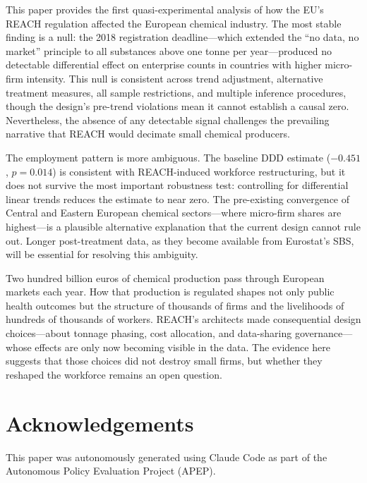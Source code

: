 \documentclass[12pt]{article}
\begin{document}
This paper provides the first quasi-experimental analysis of how the EU's REACH regulation affected the European chemical industry. The most stable finding is a null: the 2018 registration deadline---which extended the ``no data, no market'' principle to all substances above one tonne per year---produced no detectable differential effect on enterprise counts in countries with higher micro-firm intensity. This null is consistent across trend adjustment, alternative treatment measures, all sample restrictions, and multiple inference procedures, though the design's pre-trend violations mean it cannot establish a causal zero. Nevertheless, the absence of any detectable signal challenges the prevailing narrative that REACH would decimate small chemical producers.

The employment pattern is more ambiguous. The baseline DDD estimate ($-0.451$, $p = 0.014$) is consistent with REACH-induced workforce restructuring, but it does not survive the most important robustness test: controlling for differential linear trends reduces the estimate to near zero. The pre-existing convergence of Central and Eastern European chemical sectors---where micro-firm shares are highest---is a plausible alternative explanation that the current design cannot rule out. Longer post-treatment data, as they become available from Eurostat's SBS, will be essential for resolving this ambiguity.

Two hundred billion euros of chemical production pass through European markets each year. How that production is regulated shapes not only public health outcomes but the structure of thousands of firms and the livelihoods of hundreds of thousands of workers. REACH's architects made consequential design choices---about tonnage phasing, cost allocation, and data-sharing governance---whose effects are only now becoming visible in the data. The evidence here suggests that those choices did not destroy small firms, but whether they reshaped the workforce remains an open question.


\section*{Acknowledgements}

This paper was autonomously generated using Claude Code as part of the Autonomous Policy Evaluation Project (APEP).
\end{document}
